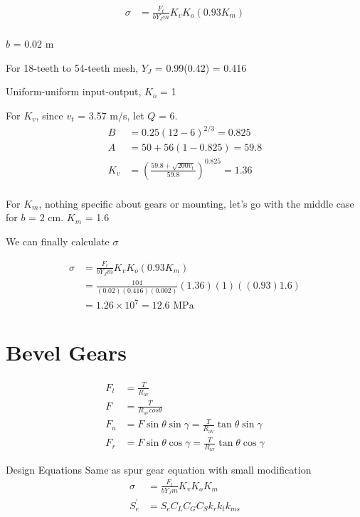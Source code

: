 \documentclass[a4paper,openany]{tufte-book}
\begin{document}
\begin{align*}
  \sigma &= \frac{F_{t}}{bY_{J}m}K_{v}K_{o}(0.93K_{m}) \\
\end{align*}

\(b\) = 0.02 m

For 18-teeth to 54-teeth mesh, \(Y_{J}\) = 0.99(0.42) = 0.416

Uniform-uniform input-output, \(K_{o}\) = 1

For \(K_{v}\), since \(v_{t}\) = 3.57 m/s, let \(Q\) = 6.
\begin{align*}
   B &= 0.25(12 - 6)^{2/3} = 0.825 \\
   A &= 50 + 56(1 - 0.825) = 59.8 \\
   K_{v} &= \left( \frac{59.8 + \sqrt{200v_{t}}}{59.8} \right)^{0.825} = 1.36 \\
\end{align*}

For \(K_{m}\), nothing specific about gears or mounting, let's go with the middle case for \(b\) = 2 cm. \(K_{m}\) = 1.6

We can finally calculate \(\sigma\)

\begin{align*}
  \sigma &= \frac{F_{t}}{bY_{J}m}K_{v}K_{o}(0.93K_{m}) \\
         &= \frac{104}{(0.02)(0.416)(0.002)}(1.36)(1)((0.93)1.6) \\
         &= 1.26 \times 10^{7} = 12.6 \text{ MPa}
\end{align*}

\chapter{Bevel Gears}
\label{sec:org0e2fe89}

\begin{align}
        F_{t} &= \frac{T}{R_{\text{av}}} \\
        F &= \frac{T}{R_{\text{av}} cos \theta} \\
        F_{a} &= F \sin \theta \sin \gamma = \frac{T}{R_{\text{av}}} \tan \theta \sin \gamma \\
        F_{r} &= F \sin \theta \cos \gamma = \frac{T}{R_{\text{av}}} \tan \theta \cos \gamma
      \end{align}

Design Equations Same as spur gear equation with small modification
\begin{align}
    \sigma &= \frac{F_{t}}{bY_{J}m} K_{v} K_{o} K_{m} \\
    S_{e}^{\prime} &= S_{e}C_{L}C_{G}C_{S}k_{r}k_{t}k_{ms}
  \end{align}
\end{document}
